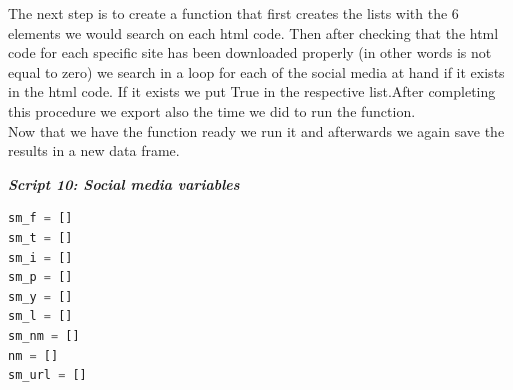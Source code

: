 \documentclass{article}
\begin{document}
The next step is to create a function that first creates the lists with the 6 elements we would search on each html code. Then after checking that the html code for each specific site has been downloaded properly (in other words is not equal to zero) we search in a loop for each of the social media at hand if it exists in the html code. If it exists we put True in the respective list.After completing this procedure we export also the time we did to run the function.\\
Now that we have the function ready we run it and afterwards we again save the results in a new data frame.
\begin{center}
\textit{\textbf{Script 10: Social media variables}}
\end{center}
\begin{lstlisting}[language=Python]
sm_f = []
sm_t = []
sm_i = []
sm_p = []
sm_y = []
sm_l = []   
sm_nm = [] 
nm = []
sm_url = []
 

\end{lstlisting}
\end{document}
